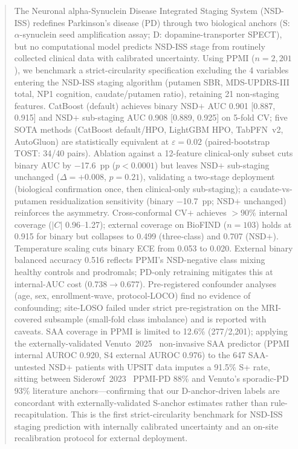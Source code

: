 
\label{p1:ch:paper1}

\begin{abstract}
The Neuronal alpha-Synuclein Disease Integrated Staging System (NSD-ISS) redefines Parkinson's disease (PD) through two biological anchors (S: $\alpha$-synuclein seed amplification assay; D: dopamine-transporter SPECT), but no computational model predicts NSD-ISS stage from routinely collected clinical data with calibrated uncertainty. Using PPMI ($n{=}2{,}201$), we benchmark a strict-circularity specification excluding the 4 variables entering the NSD-ISS staging algorithm (putamen SBR, MDS-UPDRS-III total, NP1 cognition, caudate/putamen ratio), retaining 21 non-staging features. CatBoost (default) achieves binary NSD$+$ AUC 0.901 [0.887, 0.915] and NSD$+$ sub-staging AUC 0.908 [0.889, 0.925] on 5-fold CV; five SOTA methods (CatBoost default/HPO, LightGBM HPO, TabPFN~v2, AutoGluon) are statistically equivalent at $\varepsilon{=}0.02$ (paired-bootstrap TOST: 34/40 pairs). Ablation against a 12-feature clinical-only subset cuts binary AUC by $-$17.6~pp ($p{<}0.0001$) but leaves NSD$+$ sub-staging unchanged ($\Delta{=}+0.008$, $p{=}0.21$), validating a two-stage deployment (biological confirmation once, then clinical-only sub-staging); a caudate-vs-putamen residualization sensitivity (binary $-$10.7~pp; NSD$+$ unchanged) reinforces the asymmetry. Cross-conformal CV$+$ achieves ${>}90\%$ internal coverage ($|C|$ 0.96--1.27); external coverage on BioFIND ($n{=}103$) holds at 0.915 for binary but collapses to 0.499 (three-class) and 0.707 (NSD$+$). Temperature scaling cuts binary ECE from 0.053 to 0.020. External binary balanced accuracy 0.516 reflects PPMI's NSD-negative class mixing healthy controls and prodromals; PD-only retraining mitigates this at internal-AUC cost ($0.738{\to}0.677$). Pre-registered confounder analyses (age, sex, enrollment-wave, protocol-LOCO) find no evidence of confounding; site-LOSO failed under strict pre-registration on the MRI-covered subsample (small-fold class imbalance) and is reported with caveats. SAA coverage in PPMI is limited to 12.6\% (277/2{,}201); applying the externally-validated Venuto~2025~\cite{venuto2025saa} non-invasive SAA predictor (PPMI internal AUROC 0.920, S4 external AUROC 0.976) to the 647 SAA-untested NSD+ patients with UPSIT data imputes a 91.5\% S+ rate, sitting between Siderowf~2023~\cite{siderowf2023} PPMI-PD 88\% and Venuto's sporadic-PD 93\% literature anchors---confirming that our D-anchor-driven labels are concordant with externally-validated S-anchor estimates rather than rule-recapitulation. This is the first strict-circularity benchmark for NSD-ISS staging prediction with internally calibrated uncertainty and an on-site recalibration protocol for external deployment.
\end{abstract}


